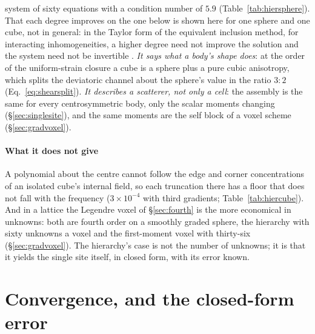 \documentclass[preprint,review,12pt]{elsarticle}
\begin{document}
system of sixty equations with a condition number of $5.9$ (Table~\ref{tab:hiersphere}). That each degree
improves on the one below is shown here for one sphere and one cube, not in general: in the Taylor form
of the equivalent inclusion method, for interacting inhomogeneities, a higher degree need not improve
the solution and the system need not be invertible \citep{RodinHwang1991,Brisard2014}. \emph{It says
what a body's shape does}: at the order of the uniform-strain closure a cube is a sphere plus a pure
cubic anisotropy, which splits the deviatoric channel about the sphere's value in the ratio $3:2$
(Eq.~\eqref{eq:shearsplit}). \emph{It describes a scatterer, not only a cell}: the assembly is the same
for every centrosymmetric body, only the scalar moments changing (\S\ref{sec:singlesite}), and the same
moments are the self block of a voxel scheme (\S\ref{sec:gradvoxel}).

\paragraph{What it does not give} A polynomial about the centre cannot follow the edge and corner
concentrations of an isolated cube's internal field, so each truncation there has a floor that does
not fall with the frequency ($3\times10^{-4}$ with third gradients; Table~\ref{tab:hiercube}). And in a
lattice the Legendre voxel of \S\ref{sec:fourth} is the more economical in unknowns: both are fourth
order on a smoothly graded sphere, the hierarchy with sixty unknowns a voxel and the first-moment voxel
with thirty-six (\S\ref{sec:gradvoxel}). The hierarchy's case is not the number of unknowns; it is that
it yields the single site itself, in closed form, with its error known.

\section{Convergence, and the closed-form error}\label{sec:convergence}
\end{document}
